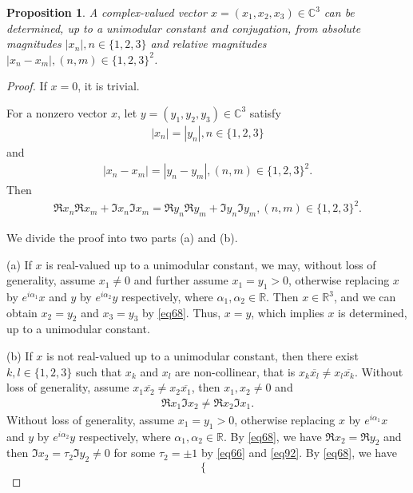 \documentclass[12pt,oneside,reqno]{amsart}
\newtheorem{proposition}[theorem]{Proposition}%
\newcommand{\R}{\mathbb{R}}
\newcommand{\C}{\mathbb{C}}
\numberwithin{equation}{section}
\begin{document}
	\begin{proposition}\label{prop2}
	A complex-valued vector $x=(x_1, x_2, x_3)\in \C^3$ can be determined, up to a unimodular constant and conjugation, from absolute magnitudes $ |x_n|, n\in \{1,2,3\} $ and relative magnitudes $  |x_n-x_m|, (n,m)\in \{1,2,3\}^2 $.
	\end{proposition}
	\begin{proof}
	 If $x=0$, it is trivial. 
	 
	 For a nonzero vector $x$,
		let $ y=(y_1, y_2, y_3)\in \C^3 $ satisfy
		\begin{align}\label{eq66}
			|x_n|=|y_n|,  n\in \{1,2,3\}
		\end{align}
		and
		\begin{align*}
			|x_n-x_m| = |y_n-y_m|,  (n,m)\in  \{1,2,3\}^2.
		\end{align*}
		Then
		\begin{align}\label{eq68}
			\Re x_n\Re x_m + \Im x_n\Im x_m = \Re y_n\Re y_m + \Im y_n\Im y_m,  (n,m)\in  \{1,2,3\}^2.
		\end{align}
		
	We divide the proof into two parts (a) and (b).
		
		(a) If $x$ is real-valued up to a unimodular constant, we may, without loss of generality, assume $x_1\ne 0$ and further assume $x_1=y_1> 0$, otherwise replacing $x$ by $ e^{i\alpha_1}x$ and $y$ by $ e^{i\alpha_2}y$ respectively, where $\alpha_1, \alpha_2 \in \R$. Then $x\in \R^3$, and we can obtain $x_2=y_2$ and $x_3=y_3$ by \eqref{eq68}. Thus, $x=y$, which implies $x$ is determined, up to a unimodular constant.
		
		(b) If $x$ is not real-valued up to a unimodular constant, then there exist $k,l\in \{1,2,3\}$ such that $x_{k}$ and $x_{l}$ are non-collinear, that is $x_{k} \overline{ x_{l}} \ne x_{l} \overline{ x_{k}}$. Without loss of generality, assume $x_{1} \overline{ x_{2}} \ne x_{2} \overline{ x_{1}}$, then $x_1, x_2 \ne 0$ and
		\begin{align}\label{eq92}
			\Re x_1 \Im x_2 \ne \Re x_2 \Im x_1.
		\end{align}
		Without loss of generality, assume $x_1=y_1>0$, otherwise replacing $x$ by $ e^{i\alpha_1}x $ and $y$ by $ e^{i\alpha_2}y $ respectively, where $\alpha_1, \alpha_2\in \R$.
		By \eqref{eq68}, we have $\Re x_2 = \Re y_2$ and then $\Im x_2 = \tau_2 \Im y_2 \ne 0$ for some $\tau_2 =\pm 1 $ by \eqref{eq66} and \eqref{eq92}. By \eqref{eq68}, we have
		\begin{equation*}
			\left\{ \begin{array}{ll}
				

\end{array}
\end{equation*}
\end{proof}
\end{document}
